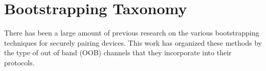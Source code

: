 \section{Bootstrapping Taxonomy}

There has been a large amount of previous research on the various bootstrapping techniques for securely pairing devices.
This work has organized these methods by the type of out of band (OOB) channels that they incorporate into their protocols. 
